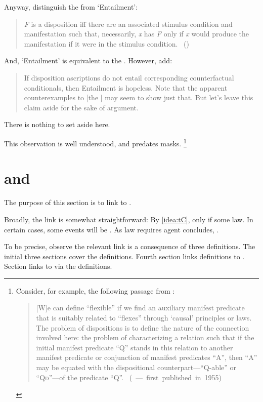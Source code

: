 \begin{note}
{    Anyway, \citeauthor{Choi:2021wg} distinguish the \dSCAa{} from `Entailment':
    \begin{quote}
      \emph{F} is a disposition iff there are an associated stimulus condition and manifestation such that, necessarily, \emph{x} has \emph{F} only if \emph{x} would produce the manifestation if it were in the stimulus condition.%
      \mbox{ }\hfill\mbox{(\citeyear[\S2.1]{Choi:2021wg})}
    \end{quote}
    And, `Entailment' is equivalent to the .
    However, \citeauthor{Choi:2021wg} add:
    \begin{quote}
      If disposition ascriptions do not entail corresponding counterfactual conditionals, then Entailment is hopeless.
      Note that the apparent counterexamples to [the \dSCA{}] may seem to show just that.
      But let's leave this claim aside for the sake of argument.
    \end{quote}
    There is nothing to set aside here.
  }

  This observation is well understood, and predates masks.%
  \footnote{
    Consider, for example, the following passage from \citeauthor{Goodman:1983aa}:

    \begin{quote}
      [W]e can define ``flexible'' if we find an auxiliary manifest predicate that is suitably related to ``flexes'' through `causal' principles or laws.
      The problem of dispositions is to define the nature of the connection involved here:
      the problem of characterizing a relation such that if the initial manifest predicate ``Q'' stands in this relation to another manifest predicate or conjunction of manifest predicates ``A'', then ``A'' may be equated with the dispositional counterpart---``Q-able'' or ``Q\textsc{d}''---of the predicate ``Q''.\nolinebreak
      \mbox{ }\hfill\mbox{(\citeyear[45]{Goodman:1983aa} --- first published in 1955)}
    \end{quote}
  }
\end{note}

\section{ and }
\label{cha:typical:tCDef}

\begin{note}
  The purpose of this section is to link \tCV{} to .

  Broadly, the link is somewhat straightforward:
  By \autoref{idea:tC}, \tCV{} only if some law.
  In certain cases, some events will be .
  As law requires agent concludes, \fc{}.

  To be precise, observe the relevant link is a consequence of three definitions.
  The initial three sections cover the definitions.
  Fourth section links definitions to \tCV{}.
  Section links \tCV{} to  via the definitions.
\end{note}


